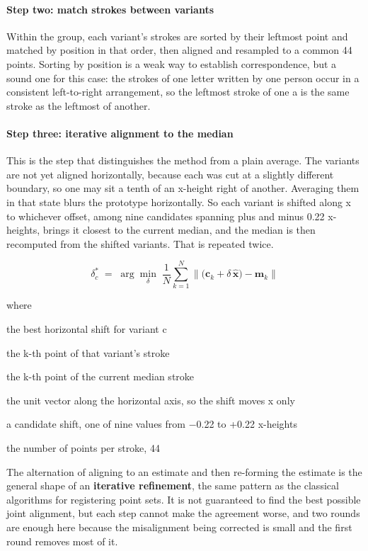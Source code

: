 \paragraph{Step two: match strokes between variants}
Within the group, each variant's strokes are sorted by their leftmost point and matched by position in that order, then aligned and resampled to a common 44 points. Sorting by position is a weak way to establish correspondence, but a sound one for this case: the strokes of one letter written by one person occur in a consistent left-to-right arrangement, so the leftmost stroke of one a is the same stroke as the leftmost of another.


\paragraph{Step three: iterative alignment to the median}
This is the step that distinguishes the method from a plain average. The variants are not yet aligned horizontally, because each was cut at a slightly different boundary, so one may sit a tenth of an x-height right of another. Averaging them in that state blurs the prototype horizontally. So each variant is shifted along x to whichever offset, among nine candidates spanning plus and minus 0.22 x-heights, brings it closest to the current median, and the median is then recomputed from the shifted variants. That is repeated twice.


\begin{equation}
\delta^{*}_c \;=\; \arg\min_{\delta} \; \frac{1}{N} \sum_{k=1}^{N} \Big\| \big(\mathbf{c}_k + \delta\,\hat{\mathbf{x}}\big) - \mathbf{m}_k \Big\|
\end{equation}

\noindent where
\begin{description}[leftmargin=2.4em,style=nextline,font=\normalfont\ttfamily]\setlength\itemsep{1pt}
  \item[{$\delta^{*}_c$}] \normalfont the best horizontal shift for variant c
  \item[{$\mathbf{c}_k$}] \normalfont the k-th point of that variant's stroke
  \item[{$\mathbf{m}_k$}] \normalfont the k-th point of the current median stroke
  \item[{$\hat{\mathbf{x}}$}] \normalfont the unit vector along the horizontal axis, so the shift moves x only
  \item[{$\delta$}] \normalfont a candidate shift, one of nine values from $-$0.22 to +0.22 x-heights
  \item[{$N$}] \normalfont the number of points per stroke, 44
\end{description}
The alternation of aligning to an estimate and then re-forming the estimate is the general shape of an \textbf{iterative refinement}, the same pattern as the classical algorithms for registering point sets. It is not guaranteed to find the best possible joint alignment, but each step cannot make the agreement worse, and two rounds are enough here because the misalignment being corrected is small and the first round removes most of it.


